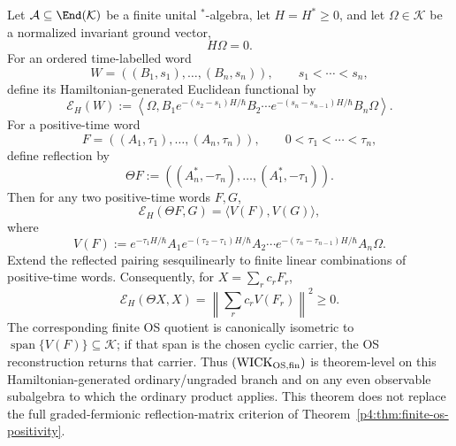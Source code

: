 \documentclass[12pt,a4paper]{article}
\begin{document}
\begin{theorem}
\label{p4:thm:hamiltonian-transfer-reflection-positivity}
Let \(\mathcal A\subseteq\End(\mathcal K)\) be a finite unital
\(^*\)-algebra, let \(H=H^*\ge0\), and let \(\Omega\in\mathcal K\) be a
normalized invariant ground vector,
\[
 H\Omega=0.
\]
For an ordered time-labelled word
\[
 W=((B_1,s_1),\ldots,(B_n,s_n)),
 \qquad s_1<\cdots<s_n,
\]
define its Hamiltonian-generated Euclidean functional by
\begin{equation}
\label{p4:eq:transfer-euclidean-word-functional}
 \mathcal E_H(W)
 :=\left\langle\Omega,
 B_1e^{-(s_2-s_1)H/\hbar}B_2\cdots
 e^{-(s_n-s_{n-1})H/\hbar}B_n\Omega\right\rangle .
\end{equation}
For a positive-time word
\[
 F=((A_1,\tau_1),\ldots,(A_n,\tau_n)),
 \qquad 0<\tau_1<\cdots<\tau_n,
\]
define reflection by
\[
 \Theta F
 :=((A_n^*,-\tau_n),\ldots,(A_1^*,-\tau_1)).
\]
Then for any two positive-time words \(F,G\),
\begin{equation}
\label{p4:eq:transfer-reflection-gram}
 \mathcal E_H(\Theta F,G)
 =\langle V(F),V(G)\rangle,
\end{equation}
where
\begin{equation}
\label{p4:eq:transfer-halfspace-vector}
 V(F)
 :=e^{-\tau_1H/\hbar}A_1
 e^{-(\tau_2-\tau_1)H/\hbar}A_2\cdots
 e^{-(\tau_n-\tau_{n-1})H/\hbar}A_n\Omega.
\end{equation}
Extend the reflected pairing sesquilinearly to finite linear combinations
of positive-time words.  Consequently, for
\(X=\sum_r c_rF_r\),
\begin{equation}
\label{p4:eq:transfer-os-norm-square}
 \boxed{
 \mathcal E_H(\Theta X,X)
 =\left\|\sum_r c_rV(F_r)\right\|^2\ge0 .}
\end{equation}
The corresponding finite OS quotient is canonically isometric to
\(\operatorname{span}\{V(F)\}\subseteq\mathcal K\); if that span is the
chosen cyclic carrier, the OS reconstruction returns that carrier.  Thus
\((\mathrm{WICK}_{\rm OS,fin})\) is theorem-level on this
Hamiltonian-generated ordinary/ungraded branch and on any even observable
subalgebra to which the ordinary product applies.  This theorem does not
replace the full graded-fermionic reflection-matrix criterion of
Theorem~\ref{p4:thm:finite-os-positivity}.
\end{theorem}
\end{document}
